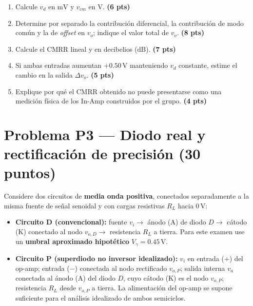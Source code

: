 \documentclass[10pt, a4paper]{article}
\begin{document}
\begin{enumerate}
    \renewcommand{\labelenumi}{(\alph{enumi})}
    \setlength{\itemsep}{2pt}
    \item Calcule $v_d$ en $\mathrm{mV}$ y $v_{cm}$ en $\mathrm{V}$. \hfill \textbf{(6 pts)}
    \item Determine por separado la contribución diferencial, la contribución de modo común y la de \textit{offset} en $v_o$; indique el valor total de $v_o$. \hfill \textbf{(8 pts)}
    \item Calcule el $\mathrm{CMRR}$ lineal y en decibelios ($\mathrm{dB}$). \hfill \textbf{(7 pts)}
    \item Si ambas entradas aumentan $+0.50\,\mathrm{V}$ manteniendo $v_d$ constante, estime el cambio en la salida $\Delta v_o$. \hfill \textbf{(5 pts)}
    \item Explique por qué el $\mathrm{CMRR}$ obtenido no puede presentarse como una medición física de los In-Amp construidos por el grupo. \hfill \textbf{(4 pts)}
\end{enumerate}

\section*{Problema P3 --- Diodo real y rectificación de precisión (30 puntos)}

Considere dos circuitos de \textbf{media onda positiva}, conectados separadamente a la misma fuente de señal senoidal y con cargas resistivas $R_L$ hacia $0\,\mathrm{V}$:

\begin{itemize}
    \setlength{\itemsep}{1pt}
    \item \textbf{Circuito D (convencional):} fuente $v_i \to$ ánodo (A) de diodo $D \to$ cátodo (K) conectado al nodo $v_{o,D} \to$ resistencia $R_L$ a tierra. Para este examen use un \textbf{umbral aproximado hipotético} $V_\gamma = 0.45\,\mathrm{V}$.
    \item \textbf{Circuito P (superdiodo no inversor idealizado):} $v_i$ en entrada ($+$) del op-amp; entrada ($-$) conectada al nodo rectificado $v_{o,P}$; salida interna $v_a$ conectada al ánodo (A) del diodo $D$, cuyo cátodo (K) es el nodo $v_{o,P}$; resistencia $R_L$ desde $v_{o,P}$ a tierra. La alimentación del op-amp se supone suficiente para el análisis idealizado de ambos semiciclos.
\end{itemize}
\end{document}
